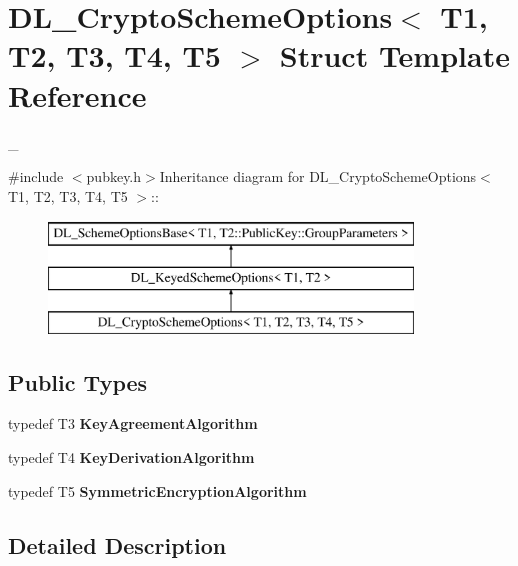 \hypertarget{struct_d_l___crypto_scheme_options}{
\section{DL\_\-CryptoSchemeOptions$<$ T1, T2, T3, T4, T5 $>$ Struct Template Reference}
\label{struct_d_l___crypto_scheme_options}
}


\_\-  


{\ttfamily \#include $<$pubkey.h$>$}Inheritance diagram for DL\_\-CryptoSchemeOptions$<$ T1, T2, T3, T4, T5 $>$::\begin{figure}[H]
\begin{center}
\leavevmode
\includegraphics[height=3cm]{struct_d_l___crypto_scheme_options}
\end{center}
\end{figure}
\subsection*{Public Types}
\begin{DoxyCompactItemize}
\item 
\hypertarget{struct_d_l___crypto_scheme_options_a744adc1b0577e89fb878e723b732a503}{
typedef T3 {\bfseries KeyAgreementAlgorithm}}
\label{struct_d_l___crypto_scheme_options_a744adc1b0577e89fb878e723b732a503}

\item 
\hypertarget{struct_d_l___crypto_scheme_options_ae6e3014dd6c5451db38b26051ba2f763}{
typedef T4 {\bfseries KeyDerivationAlgorithm}}
\label{struct_d_l___crypto_scheme_options_ae6e3014dd6c5451db38b26051ba2f763}

\item 
\hypertarget{struct_d_l___crypto_scheme_options_a08e17f0b75d0648c0151a5fc1a54595d}{
typedef T5 {\bfseries SymmetricEncryptionAlgorithm}}
\label{struct_d_l___crypto_scheme_options_a08e17f0b75d0648c0151a5fc1a54595d}

\end{DoxyCompactItemize}


\subsection{Detailed Description}
